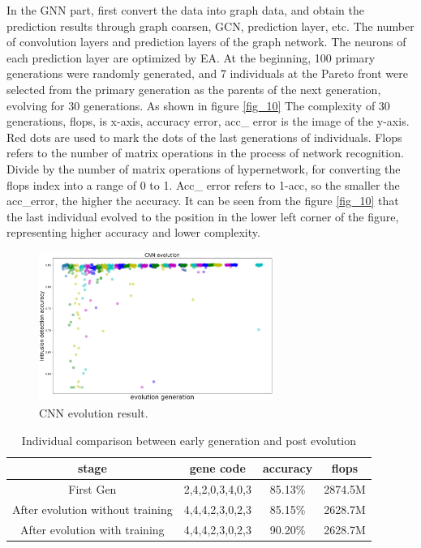 \documentclass[lettersize,journal]{IEEEtran}
\begin{document}
In the GNN part, first convert the data into graph data, and obtain the prediction results through graph coarsen, GCN, prediction layer, etc. The number of convolution layers and prediction layers of the graph network. The neurons of each prediction layer are optimized by EA. At the beginning, 100 primary generations were randomly generated, and 7 individuals at the Pareto front were selected from the primary generation as the parents of the next generation, evolving for 30 generations. As shown in figure \ref{fig_10} The complexity of 30 generations, flops, is x-axis, accuracy error, acc\_ error is the image of the y-axis. Red dots are used to mark the dots of the last  generations of individuals. Flops refers to the number of matrix operations in the process of network recognition. Divide by the number of matrix operations of hypernetwork, for converting the flops index into a range of 0 to 1. Acc\_ error refers to 1-acc, so the smaller the acc\_error, the higher the accuracy. It can be seen from the figure \ref{fig_10} that the last individual evolved to the position in the lower left corner of the figure, representing higher accuracy and lower complexity.

\begin{figure}[!t]
\centering
\includegraphics[width=3in]{cnn_evo}
\caption{CNN evolution result.}
\label{fig_9}
\end{figure}

\begin{table}[!t]
\caption{Individual comparison between early generation and post evolution\label{table3}}
\centering
\begin{tabular}{cccc}
\hline
stage & gene code & accuracy	 & flops\\
\hline
First Gen &  2,4,2,0,3,4,0,3 &  85.13\% &  2874.5M\\
After evolution without training & 4,4,4,2,3,0,2,3 & 85.15\% & 2628.7M\\
After evolution with training & 4,4,4,2,3,0,2,3 & 90.20\% & 2628.7M\\
\hline
\end{tabular}
\end{table}
\end{document}
